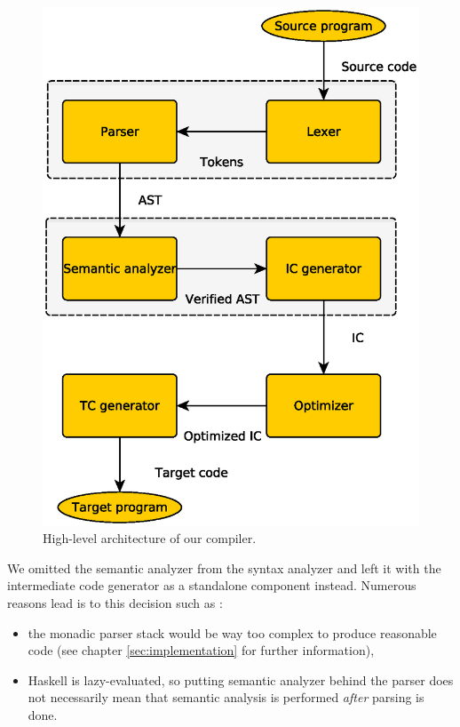 \documentclass[titlepage]{article}
\begin{document}
\begin{figure}[h!]
	\centering
	\includegraphics[scale=0.5]{figures/compilerArchitecture}
	\caption{High-level architecture of our compiler.}
	\label{fig:architecture}
\end{figure}

We omitted the semantic analyzer from the syntax analyzer and left it with the intermediate
code generator as a standalone component instead. Numerous reasons lead is to this decision
such as :

\begin{itemize}
	\item the monadic parser stack would be way too complex to produce reasonable code
		(see chapter \ref{sec:implementation} for further information),
	\item Haskell is lazy-evaluated, so putting semantic analyzer behind the parser does
		not necessarily mean that semantic analysis is performed \textit{after}
		parsing is done.
\end{itemize}
\end{document}
